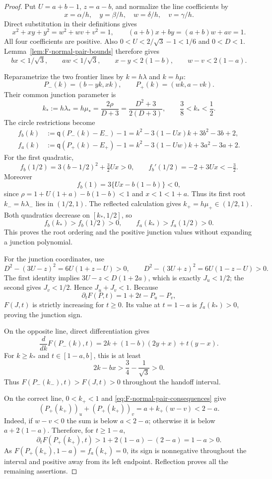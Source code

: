 \begin{proof}
Put $U=a+b-1$, $z=a-b$, and normalize the line coefficients by
\[
 x=\alpha/h,\quad y=\beta/h,\quad
 w=\delta/h,\quad v=\gamma/h.
\]
Direct substitution in their definitions gives
\[
 x^2+xy+y^2=w^2+wv+v^2=1,
 \qquad (a+b)x+by=(a+b)w+av=1.
\]
All four coefficients are positive. Also
$0<U<2/\sqrt3-1<1/6$ and $0<D<1$.
Lemma~\ref{lem:F-normal-pair-bounds} therefore gives
\begin{equation}
 bx<1/\sqrt3,\qquad aw<1/\sqrt3,\qquad
 x-y<2(1-b),\qquad w-v<2(1-a).
 \label{eq:F-normal-pair-consequences}
\end{equation}

Reparametrize the two frontier lines by $k=h\lambda$ and $k=h\mu$:
\[
 P_-(k)=(b-yk,xk),\qquad P_+(k)=(wk,a-vk).
\]
Their common junction parameter is
\[
 k_*:=h\lambda_*=h\mu_*=
 \frac{2\rho}{D+3}=\frac{D^2+3}{2(D+3)},
 \qquad \frac38<k_*<\frac12.
\]
The circle restrictions become
\[
 \begin{aligned}
 f_b(k)&:=\mathsf q(P_-(k)-E_-)-1
       =k^2-3(1-Ux)k+3b^2-3b+2,\\
 f_a(k)&:=\mathsf q(P_+(k)-E_+)-1
       =k^2-3(1-Uw)k+3a^2-3a+2.
 \end{aligned}
\]
For the first quadratic,
\[
 f_b(1/2)=3(b-1/2)^2+\tfrac32Ux>0,
 \qquad f_b'(1/2)=-2+3Ux<-\tfrac32.
\]
Moreover
\[
 f_b(1)=3\{Ux-b(1-b)\}<0,
\]
since $\rho=1+U(1+a)-b(1-b)<1$ and $x<1<1+a$.
Thus its first root $k_-=h\lambda_-$ lies in $(1/2,1)$.
The reflected calculation gives $k_+=h\mu_+\in(1/2,1)$.
Both quadratics decrease on $[k_*,1/2]$, so
\[
 f_b(k_*)>f_b(1/2)>0,\qquad f_a(k_*)>f_a(1/2)>0.
\]
This proves the root ordering and the positive junction values without
expanding a junction polynomial.

For the junction coordinates, use
\[
 D^2-(3U-z)^2=6U(1+z-U)>0,\qquad
 D^2-(3U+z)^2=6U(1-z-U)>0.
\]
The first identity implies $3U-z<D(1+2a)$, which is exactly
$J_u<1/2$; the second gives $J_v<1/2$. Hence $J_u+J_v<1$.
Because
\[
 \partial_tF(P,t)=1+2t-P_u-P_v,
\]
$F(J,t)$ is strictly increasing for $t\ge0$.
Its value at $t=1-a$ is $f_a(k_*)>0$, proving the junction sign.

On the opposite line, direct differentiation gives
\[
 \frac{d}{dk}F(P_-(k),t)
 =2k+(1-b)(2y+x)+t(y-x).
\]
For $k\ge k_*$ and $t\in[1-a,b]$, this is at least
\[
 2k-bx>\frac34-\frac1{\sqrt3}>0.
\]
Thus $F(P_-(k_-),t)>F(J,t)>0$ throughout the handoff interval.

On the correct line, $0<k_+<1$ and \eqref{eq:F-normal-pair-consequences}
give
\[
 (P_+(k_+))_u+(P_+(k_+))_v
 =a+k_+(w-v)<2-a.
\]
Indeed, if $w-v<0$ the sum is below $a<2-a$; otherwise it is below
$a+2(1-a)$. Therefore, for $t\ge1-a$,
\[
 \partial_tF(P_+(k_+),t)>1+2(1-a)-(2-a)=1-a>0.
\]
As $F(P_+(k_+),1-a)=f_a(k_+)=0$, its sign is nonnegative
throughout the interval and positive away from its left endpoint.
Reflection proves all the remaining assertions.
\end{proof}

